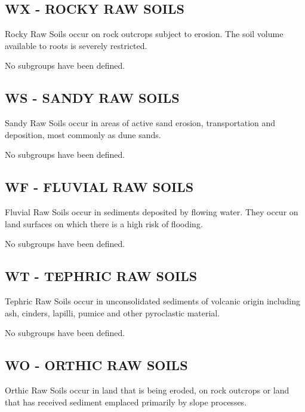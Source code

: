 \documentclass[
  letterpaper,
  DIV=11,
  numbers=noendperiod]{scrreprt}
\begin{document}
\hypertarget{sec-WX}{%
\subsection{\texorpdfstring{\textbf{WX} - ROCKY RAW
SOILS}{WX - ROCKY RAW SOILS}}\label{sec-WX}}

Rocky Raw Soils occur on rock outcrops subject to erosion. The soil
volume available to roots is severely restricted.

No subgroups have been defined.

\hypertarget{sec-WS}{%
\subsection{\texorpdfstring{\textbf{WS} - SANDY RAW
SOILS}{WS - SANDY RAW SOILS}}\label{sec-WS}}

Sandy Raw Soils occur in areas of active sand erosion, transportation
and deposition, most commonly as dune sands.

No subgroups have been defined.

\hypertarget{sec-WF}{%
\subsection{\texorpdfstring{\textbf{WF} - FLUVIAL RAW
SOILS}{WF - FLUVIAL RAW SOILS}}\label{sec-WF}}

Fluvial Raw Soils occur in sediments deposited by flowing water. They
occur on land surfaces on which there is a high risk of flooding.

No subgroups have been defined.

\hypertarget{sec-WT}{%
\subsection{\texorpdfstring{\textbf{WT} - TEPHRIC RAW
SOILS}{WT - TEPHRIC RAW SOILS}}\label{sec-WT}}

Tephric Raw Soils occur in unconsolidated sediments of volcanic origin
including ash, cinders, lapilli, pumice and other pyroclastic material.

No subgroups have been defined.

\hypertarget{sec-WO}{%
\subsection{\texorpdfstring{\textbf{WO} - ORTHIC RAW
SOILS}{WO - ORTHIC RAW SOILS}}\label{sec-WO}}

Orthic Raw Soils occur in land that is being eroded, on rock outcrops or
land that has received sediment emplaced primarily by slope processes.
\end{document}
